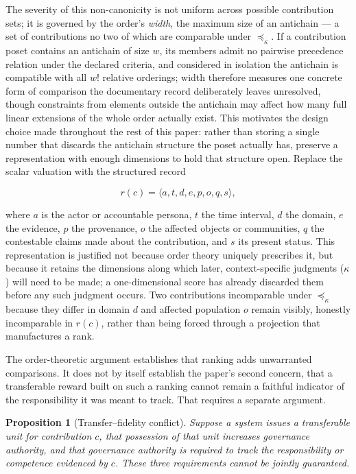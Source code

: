 \documentclass[11pt,oneside]{article}
\theoremstyle{plain}
\newtheorem{proposition}{Proposition}
\theoremstyle{definition}
\begin{document}
The severity of this non-canonicity is not uniform across possible contribution sets; it is governed by the order's \emph{width}, the maximum size of an antichain --- a set of contributions no two of which are comparable under $\preceq_\kappa$. If a contribution poset contains an antichain of size $w$, its members admit no pairwise precedence relation under the declared criteria, and considered in isolation the antichain is compatible with all $w!$ relative orderings; width therefore measures one concrete form of comparison the documentary record deliberately leaves unresolved, though constraints from elements outside the antichain may affect how many full linear extensions of the whole order actually exist. This motivates the design choice made throughout the rest of this paper: rather than storing a single number that discards the antichain structure the poset actually has, preserve a representation with enough dimensions to hold that structure open. Replace the scalar valuation with the structured record

\begin{equation}
r(c) = \langle a, t, d, e, p, o, q, s \rangle,
\end{equation}

where $a$ is the actor or accountable persona, $t$ the time interval, $d$ the domain, $e$ the evidence, $p$ the provenance, $o$ the affected objects or communities, $q$ the contestable claims made about the contribution, and $s$ its present status. This representation is justified not because order theory uniquely prescribes it, but because it retains the dimensions along which later, context-specific judgments ($\kappa$) will need to be made; a one-dimensional score has already discarded them before any such judgment occurs. Two contributions incomparable under $\preceq_\kappa$ because they differ in domain $d$ and affected population $o$ remain visibly, honestly incomparable in $r(c)$, rather than being forced through a projection that manufactures a rank.

The order-theoretic argument establishes that ranking adds unwarranted comparisons. It does not by itself establish the paper's second concern, that a transferable reward built on such a ranking cannot remain a faithful indicator of the responsibility it was meant to track. That requires a separate argument.

\begin{proposition}[Transfer--fidelity conflict]
Suppose a system issues a transferable unit for contribution $c$, that possession of that unit increases governance authority, and that governance authority is required to track the responsibility or competence evidenced by $c$. These three requirements cannot be jointly guaranteed.
\end{proposition}
\end{document}
